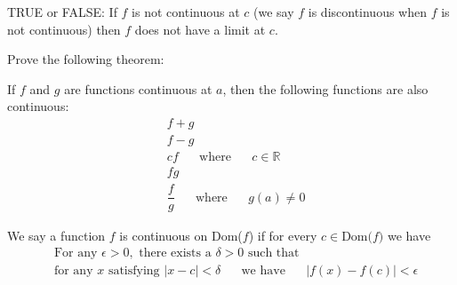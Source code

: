\begin{exercise}
TRUE or FALSE: If $f$ is not continuous at $c$ (we say $f$ is discontinuous when $f$ is not continuous) then $f$ does not have a limit at $c$.
\end{exercise}

\begin{exercise}
Prove the following theorem:
\begin{theorem}
If $f$ and $g$ are functions continuous at $a$, then the following functions are also continuous:
\begin{align*}
    &f + g\\[2ex]
    &f - g\\[2ex]
    &cf \hspace{20pt} \text{where} \hspace{20pt} c \in \mathbb{R}\\[2ex]
    &fg\\[2ex]
    &\dfrac{f}{g} \hspace{20pt} \text{where} \hspace{20pt} g(a) \neq 0
\end{align*}
\end{theorem}
\end{exercise}

\begin{definition}
We say a function $f$ is continuous on Dom($f$) if for every $c \in \text{Dom($f$)}$ we have 
\begin{align*}
    &\text{For any} \hspace{4pt} \epsilon > 0, \hspace{4pt} \text{there exists a} \hspace{4pt} \delta > 0 \hspace{4pt} \text{such that}\\[2ex]
    &\text{for any} \hspace{4pt} x \hspace{4pt} \text{satisfying} \hspace{4pt} \lvert x - c \rvert < \delta \hspace{20pt} \text{we have} \hspace{20pt} \lvert f(x) - f(c) \rvert < \epsilon
\end{align*}
\end{definition}

